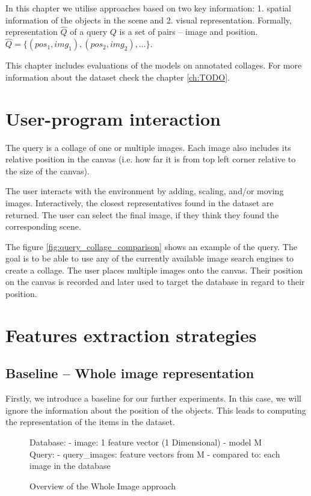 In this chapter we utilise approaches based on two key information: 1. spatial information of the objects in the scene and 2. visual representation. Formally, representation $\hat{Q}$ of a query $Q$ is a set of pairs -- image and position. $\hat{Q} = \{ (pos_1, img_1), (pos_2, img_2), \dots \}$.

This chapter includes evaluations of the models on annotated collages. For more information about the dataset check the chapter \ref{ch:TODO}. 

\section{User-program interaction}

The query is a collage of one or multiple images. Each image also includes its relative position in the canvas (i.e. how far it is from top left corner relative to the size of the canvas).

The user interacts with the environment by adding, scaling, and/or moving images. Interactively, the closest representatives found in the dataset are returned. The user can select the final image, if they think they found the corresponding scene. 

The figure \ref{fig:query_collage_comparison} shows an example of the query. The goal is to be able to use any of the currently available image search engines to create a collage. The user places multiple images onto the canvas. Their position on the canvas is recorded and later used to target the database in regard to their position. 

\section{Features extraction strategies}

\subsection{Baseline -- Whole image representation}

Firstly, we introduce a baseline for our further experiments. In this case, we will ignore the information about the position of the objects. This leads to computing the representation of the items in the dataset.

\begin{figure}
\centering
\begin{boxedverbatim}
Database:
    - image: 1 feature vector (1 Dimensional)
    - model M
Query:
    - query_images: feature vectors from M
    - compared to: each image in the database
\end{boxedverbatim}
\caption{Overview of the Whole Image approach}
\end{figure}

